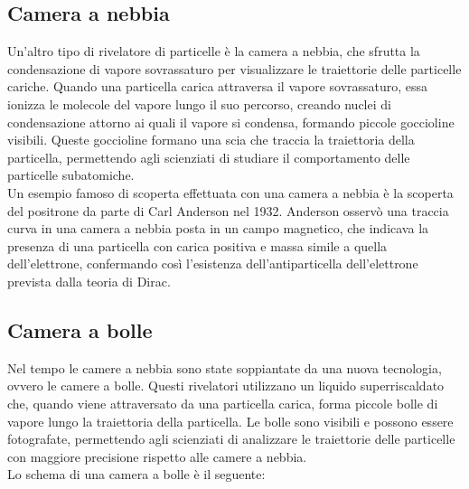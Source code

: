\subsection{Camera a nebbia}
Un'altro tipo di rivelatore di particelle è la camera a nebbia, che sfrutta la condensazione di vapore sovrassaturo per visualizzare le traiettorie delle particelle cariche. Quando una particella carica attraversa il vapore sovrassaturo, essa ionizza le molecole del vapore lungo il suo percorso, creando nuclei di condensazione attorno ai quali il vapore si condensa, formando piccole goccioline visibili. Queste goccioline formano una scia che traccia la traiettoria della particella, permettendo agli scienziati di studiare il comportamento delle particelle subatomiche.\\
Un esempio famoso di scoperta effettuata con una camera a nebbia è la scoperta del positrone da parte di Carl Anderson nel 1932. Anderson osservò una traccia curva in una camera a nebbia posta in un campo magnetico, che indicava la presenza di una particella con carica positiva e massa simile a quella dell'elettrone, confermando così l'esistenza dell'antiparticella dell'elettrone prevista dalla teoria di Dirac.


\subsection{Camera a bolle}
Nel tempo le camere a nebbia sono state soppiantate da una nuova tecnologia, ovvero le camere a bolle. Questi rivelatori utilizzano un liquido superriscaldato che, quando viene attraversato da una particella carica, forma piccole bolle di vapore lungo la traiettoria della particella. Le bolle sono visibili e possono essere fotografate, permettendo agli scienziati di analizzare le traiettorie delle particelle con maggiore precisione rispetto alle camere a nebbia.\\
Lo schema di una camera a bolle è il seguente:

